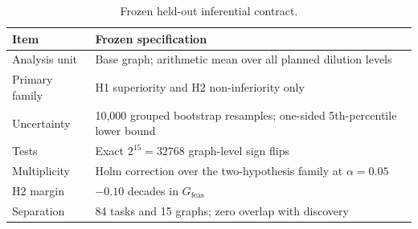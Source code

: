 
\begin{table}[ht]
\centering
\caption{Frozen held-out inferential contract.}
\label{tab:statistics-contract}
\small
\begin{tabularx}{\textwidth}{@{}lX@{}}
\toprule
Item & Frozen specification \\
\midrule
Analysis unit & Base graph; arithmetic mean over all planned dilution levels \\
Primary family & H1 superiority and H2 non-inferiority only \\
Uncertainty & 10,000 grouped bootstrap resamples; one-sided 5th-percentile lower bound \\
Tests & Exact $2^{15}=32768$ graph-level sign flips \\
Multiplicity & Holm correction over the two-hypothesis family at $\alpha=0.05$ \\
H2 margin & $-0.10$ decades in $G_{\mathrm{feas}}$ \\
Separation & 84 tasks and 15 graphs; zero overlap with discovery \\
\bottomrule
\end{tabularx}
\end{table}
